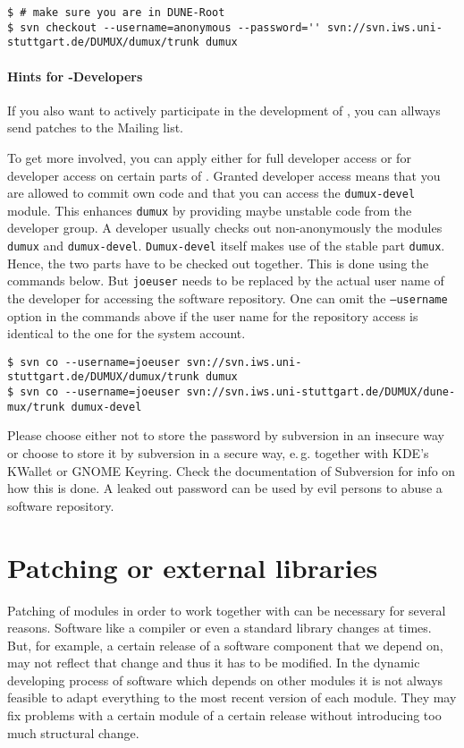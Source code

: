 \begin{lstlisting}[style=Bash]
$ # make sure you are in DUNE-Root
$ svn checkout --username=anonymous --password='' svn://svn.iws.uni-stuttgart.de/DUMUX/dumux/trunk dumux
\end{lstlisting}

\paragraph{Hints for \Dumux-Developers}
If you also want to actively participate in the development of \Dumux, you can allways send patches
to the Mailing list.

To get more involved, you can apply either for full developer
access or for developer access on certain parts of \Dumux. Granted developer access means that
you are allowed to commit own code and that you can access the \texttt{dumux-devel} module.
This enhances \texttt{dumux} by providing maybe unstable code from the developer group.
A developer usually checks out non-anonymously the modules \texttt{dumux} and \texttt{dumux-devel}. 
\texttt{Dumux-devel} itself makes use of the stable part \texttt{dumux}. Hence, the two parts have to be checked out together.
This is done using the commands below. But \texttt{joeuser} needs to be replaced by
the actual user name of the developer for accessing the software repository. 
One can omit the \texttt{--username} option in the commands above if the user name for the repository access is
identical to the one for the system account.

\begin{lstlisting}[style=Bash]
$ svn co --username=joeuser svn://svn.iws.uni-stuttgart.de/DUMUX/dumux/trunk dumux
$ svn co --username=joeuser svn://svn.iws.uni-stuttgart.de/DUMUX/dune-mux/trunk dumux-devel
\end{lstlisting}

Please choose either not to store the password by subversion in an insecure way or
choose to store it by subversion in a secure way, e.\,g. together with KDE's KWallet or GNOME Keyring.
Check the documentation of Subversion for info on how this is done.
A leaked out password can be used by evil persons to abuse a software repository.

\section{Patching \Dune or external libraries}
Patching of \Dune modules in order to work together with \Dumux can be necessary for several reasons.
Software like a compiler or even a standard library
changes at times. But, for example, a certain release of a software component that we depend on, 
may not reflect that change and thus it has to be modified.
In the dynamic developing process of software which depends on other modules it is not always feasible 
to adapt everything to the most recent version of each module. They may fix problems with a certain module
of a certain release without introducing too much structural change.

